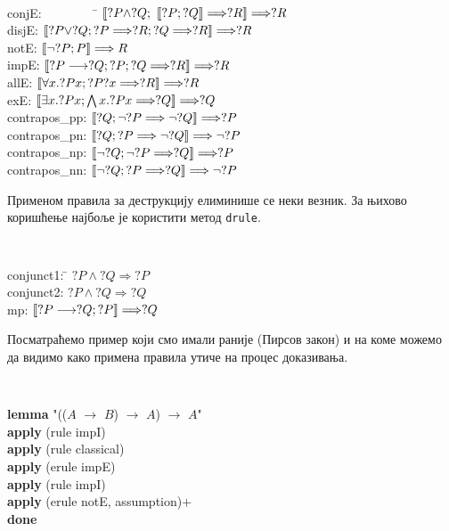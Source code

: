 \begin{small}
{\tt 
\begin{tabbing}
 conjE:\ \ \ \ \ \ \ \ \ \= $\lbrakk ?P \land ?Q;\ \lbrakk ?P; ?Q \rbrakk \Longrightarrow ?R \rbrakk \Longrightarrow ?R$ \\
 disjE: \> $\llbracket ?P \lor ?Q; ?P \Longrightarrow ?R; ?Q \Longrightarrow ?R \rrbracket \Longrightarrow ?R$ \\
 notE:  \> $\llbracket \neg ?P ; P \rrbracket \Longrightarrow R$ \\
 impE: \> $\llbracket ?P \longrightarrow ?Q; ?P; ?Q \Longrightarrow ?R \rrbracket \Longrightarrow ?R$ \\
 allE: \> $\llbracket \forall x. ?P x; ?P ?x \Longrightarrow ?R \rrbracket \Longrightarrow ?R$ \\
 exE:  \> $\llbracket \exists x. ?P x ; \bigwedge x. ?P x \Longrightarrow ?Q \rrbracket \Longrightarrow ?Q$ \\
 contrapos\_pp: \> $\llbracket ?Q; \neg ?P \Longrightarrow \neg ?Q \rrbracket \Longrightarrow ?P$ \\
 contrapos\_pn: \> $\llbracket ?Q; ?P \Longrightarrow \neg ?Q \rrbracket \Longrightarrow \neg ?P$ \\
 contrapos\_np: \> $\llbracket \neg ?Q; \neg ?P \Longrightarrow ?Q \rrbracket \Longrightarrow ?P$ \\
 contrapos\_nn: \> $\llbracket \neg ?Q; ?P \Longrightarrow ?Q \rrbracket \Longrightarrow \neg ?P$ 
\end{tabbing}
}
\end{small}

Применом правила за деструкцију елиминише се неки везник. За њихово
коришћење најбоље је користити метод {\tt drule}.

\begin{small}
{\tt 
\begin{tabbing}
 conjunct1: \= $?P \land ?Q \Longrightarrow ?P$ \\
 conjunct2: \> $?P \land ?Q \Longrightarrow ?Q$ \\
 mp:        \> $\llbracket ?P \longrightarrow ?Q; ?P \rrbracket \Longrightarrow ?Q$ 
\end{tabbing}
}
\end{small}

Посматраћемо пример који смо имали раније (Пирсов закон) и на коме
можемо да видимо како примена правила утиче на процес доказивања.

\begin{small}
{\tt 
\begin{tabbing}
\textbf{lemma} "(($A$ $\longrightarrow$ $B$) $\longrightarrow$ $A$) $\longrightarrow$ $A$" \\
\textbf{apply} (rule impI) \\
\textbf{apply} (rule classical) \\
\textbf{apply} (erule impE) \\
\textbf{apply} (rule impI) \\
\textbf{apply} (erule notE, assumption)+ \\
\textbf{done}
\end{tabbing}
}
\end{small}

